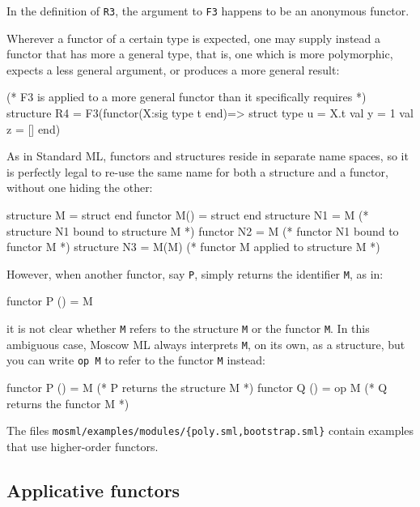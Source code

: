 \documentclass[fleqn,a4paper]{article}
\begin{document}
\noindent 
In the definition of {\tt R3}, the argument to {\tt F3} happens to be an anonymous functor.

\noindent 
Wherever a functor of a certain type is expected, one may supply
instead a functor that has more a general type, that is, one which is
more polymorphic, expects a less general argument, or produces a more
general result:

\begin{program}
(* F3  is applied to a more general functor than it specifically requires *)
structure R4 = F3(functor(X:sig type t end)=> 
                  struct type u = X.t val y = 1 val z = [] end)
\end{program}

\noindent 
As in Standard ML, functors and structures reside in separate name spaces,
so it is perfectly legal to re-use the same name for both a structure and a functor, without
one hiding the other:

\begin{program}
structure M = struct end
functor M() = struct end
structure N1 = M             (* structure N1 bound to structure M *)
functor   N2 = M             (* functor N1 bound to functor M *)
structure N3 = M(M)          (* functor M applied to structure M *)
\end{program}

\noindent
However, when another functor, say {\tt P}, simply returns the identifier {\tt M}, as in:
\begin{program}
functor P () = M
\end{program}

\noindent
it is not clear whether {\tt M} refers to the structure {\tt M} or the functor {\tt M}\@. 
In this ambiguous case, Moscow ML always interprets 
{\tt M}, on its own, as a structure, but you can write {\tt op M}
to refer to the functor {\tt M} instead:
\begin{program}
functor P () = M      (* P returns the structure M *)
functor Q () = op M   (* Q returns the functor M *) 
\end{program}

\noindent 
The files {\tt mosml/examples/modules/\{poly.sml,bootstrap.sml\}} contain
examples that use higher-order functors.

\subsection{Applicative functors}
\label{sec-applicative-functors}
\end{document}
